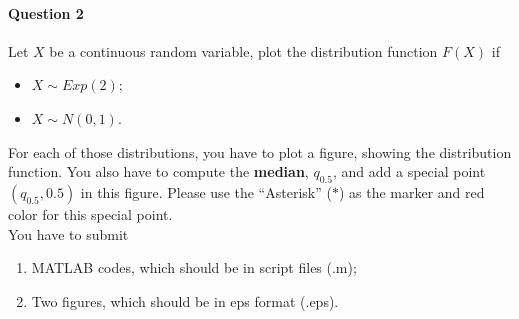 \documentclass[11pt]{article} %
\begin{document}
\paragraph*{Question 2}
Let $X$ be a continuous random variable, plot the distribution function $F(X)$ if 
\begin{itemize}
\item $X \sim Exp(2)$;
\item $X \sim N(0, 1)$. 
\end{itemize}
For each of those distributions, you have to plot a figure, showing the distribution function. You also have to compute the {\bf median}, $q_{0.5}$, and add a special point $(q_{0.5}, 0.5)$ in this figure. Please use the ``Asterisk'' ($\ast$) as the marker and {\color{red}red} color for this special point. \\
You have to submit 
\begin{enumerate}
\item MATLAB codes, which should be in script files (.m);
\item Two figures, which should be in eps format (.eps).
\end{enumerate}
\end{document}
